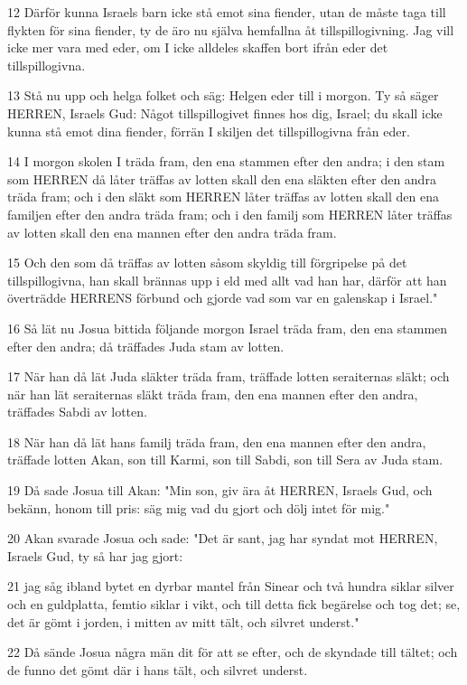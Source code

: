 \par 12 Därför kunna Israels barn icke stå emot sina fiender, utan de måste taga till flykten för sina fiender, ty de äro nu själva hemfallna åt tillspillogivning. Jag vill icke mer vara med eder, om I icke alldeles skaffen bort ifrån eder det tillspillogivna.
\par 13 Stå nu upp och helga folket och säg: Helgen eder till i morgon. Ty så säger HERREN, Israels Gud: Något tillspillogivet finnes hos dig, Israel; du skall icke kunna stå emot dina fiender, förrän I skiljen det tillspillogivna från eder.
\par 14 I morgon skolen I träda fram, den ena stammen efter den andra; i den stam som HERREN då låter träffas av lotten skall den ena släkten efter den andra träda fram; och i den släkt som HERREN låter träffas av lotten skall den ena familjen efter den andra träda fram; och i den familj som HERREN låter träffas av lotten skall den ena mannen efter den andra träda fram.
\par 15 Och den som då träffas av lotten såsom skyldig till förgripelse på det tillspillogivna, han skall brännas upp i eld med allt vad han har, därför att han överträdde HERRENS förbund och gjorde vad som var en galenskap i Israel."
\par 16 Så lät nu Josua bittida följande morgon Israel träda fram, den ena stammen efter den andra; då träffades Juda stam av lotten.
\par 17 När han då lät Juda släkter träda fram, träffade lotten seraiternas släkt; och när han lät seraiternas släkt träda fram, den ena mannen efter den andra, träffades Sabdi av lotten.
\par 18 När han då lät hans familj träda fram, den ena mannen efter den andra, träffade lotten Akan, son till Karmi, son till Sabdi, son till Sera av Juda stam.
\par 19 Då sade Josua till Akan: "Min son, giv ära åt HERREN, Israels Gud, och bekänn, honom till pris: säg mig vad du gjort och dölj intet för mig."
\par 20 Akan svarade Josua och sade: "Det är sant, jag har syndat mot HERREN, Israels Gud, ty så har jag gjort:
\par 21 jag såg ibland bytet en dyrbar mantel från Sinear och två hundra siklar silver och en guldplatta, femtio siklar i vikt, och till detta fick begärelse och tog det; se, det är gömt i jorden, i mitten av mitt tält, och silvret underst."
\par 22 Då sände Josua några män dit för att se efter, och de skyndade till tältet; och de funno det gömt där i hans tält, och silvret underst.
